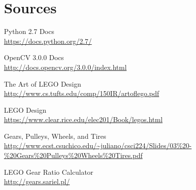 \section{Sources}

\begin{description}

\large\item Python 2.7 Docs\\
\small\url{https://docs.python.org/2.7/}

\medskip

\large\item OpenCV 3.0.0 Docs\\
\small\url{http://docs.opencv.org/3.0.0/index.html}

\medskip

\large\item The Art of LEGO Design\\
\small\url{http://www.cs.tufts.edu/comp/150IR/artoflego.pdf}

\medskip

\large\item LEGO Design\\
\small\url{https://www.clear.rice.edu/elec201/Book/legos.html}

\medskip

\large\item Gears, Pulleys, Wheels, and Tires\\
\small\url{http://www.ecst.csuchico.edu/~juliano/csci224/Slides/03\%20-\%20Gears\%20Pulleys\%20Wheels\%20Tires.pdf}

\medskip

\large\item LEGO Gear Ratio Calculator\\
\small\url{http://gears.sariel.pl/}

\end{description}


\newpage
